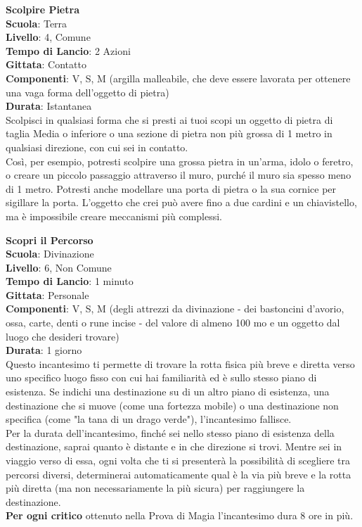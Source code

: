 \begin{multicols}{2}
\medskip\textbf{Scolpire Pietra}\\
\textbf{Scuola}: Terra\\
\textbf{Livello}: 4, Comune\\
\textbf{Tempo di Lancio}: 2 Azioni\\
\textbf{Gittata}: Contatto\\
\textbf{Componenti}: V, S, M (argilla malleabile, che deve essere lavorata per ottenere una vaga forma dell'oggetto di pietra)\\
\textbf{Durata}: Istantanea\\
Scolpisci in qualsiasi forma che si presti ai tuoi scopi un oggetto di pietra di taglia Media o inferiore o una sezione di pietra non più grossa di 1 metro in qualsiasi direzione, con cui sei in contatto.\\
Così, per esempio, potresti scolpire una grossa pietra in un'arma, idolo o feretro, o creare un piccolo passaggio attraverso il muro, purché il muro sia spesso meno di 1 metro. Potresti anche modellare una porta di pietra o la sua cornice per sigillare la porta. L'oggetto che crei può avere fino a due cardini e un chiavistello, ma è impossibile creare meccanismi più complessi.

\medskip\textbf{Scopri il Percorso}\\
\textbf{Scuola}: Divinazione\\
\textbf{Livello}: 6, Non Comune\\
\textbf{Tempo di Lancio}: 1 minuto\\
\textbf{Gittata}: Personale\\
\textbf{Componenti}: V, S, M (degli attrezzi da divinazione - dei bastoncini d'avorio, ossa, carte, denti o rune incise - del valore di almeno 100 mo e un oggetto dal luogo che desideri trovare)\\
\textbf{Durata}: 1 giorno\\
Questo incantesimo ti permette di trovare la rotta fisica più breve e diretta verso uno specifico luogo fisso con cui hai familiarità ed è sullo stesso piano di esistenza. Se indichi una destinazione su di un altro piano di esistenza, una destinazione che si muove (come una fortezza mobile) o una destinazione non specifica (come "la tana di un drago verde"), l'incantesimo fallisce.\\
Per la durata dell'incantesimo, finché sei nello stesso piano di esistenza della destinazione, saprai quanto è distante e in che direzione si trovi. Mentre sei in viaggio verso di essa, ogni volta che ti si presenterà la possibilità di scegliere tra percorsi diversi, determinerai automaticamente qual è la via più breve e la rotta più diretta (ma non necessariamente la più sicura) per raggiungere la destinazione.\\
\textbf{Per ogni critico} ottenuto nella Prova di Magia l'incantesimo dura 8 ore in più.


\end{multicols}
